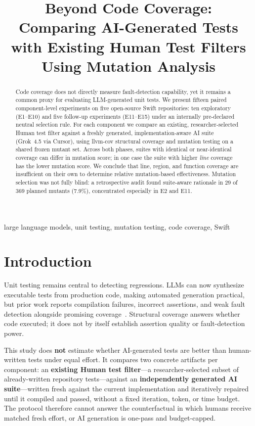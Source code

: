 \documentclass[10pt,conference]{IEEEtran}
\title{Beyond Code Coverage: Comparing AI-Generated Tests with Existing Human Test Filters Using Mutation Analysis}
\author{\IEEEauthorblockN{Premal Mistry, Randhir Kumar}
\IEEEauthorblockA{Independent Researcher}}
\begin{document}
\maketitle

\begin{abstract}
Code coverage does not directly measure fault-detection capability, yet it remains a common proxy for evaluating LLM-generated unit tests. We present fifteen paired component-level experiments on five open-source Swift repositories: ten exploratory (E1--E10) and five follow-up experiments (E11--E15) under an internally pre-declared neutral selection rule. For each component we compare an existing, researcher-selected Human test filter against a freshly generated, implementation-aware AI suite (Grok~4.5 via Cursor), using llvm-cov structural coverage and mutation testing on a shared frozen mutant set. Across both phases, suites with identical or near-identical coverage can differ in mutation score; in one case the suite with higher \emph{line} coverage has the lower mutation score. We conclude that line, region, and function coverage are insufficient on their own to determine relative mutation-based effectiveness. Mutation selection was not fully blind: a retrospective audit found suite-aware rationale in 29 of 369 planned mutants (7.9\%), concentrated especially in E2 and E11.
\end{abstract}

\begin{IEEEkeywords}
large language models, unit testing, mutation testing, code coverage, Swift
\end{IEEEkeywords}

\section{Introduction}
Unit testing remains central to detecting regressions. LLMs can now synthesize executable tests from production code, making automated generation practical, but prior work reports compilation failures, incorrect assertions, and weak fault detection alongside promising coverage~\cite{yuan2023}. Structural coverage answers whether code executed; it does not by itself establish assertion quality or fault-detection power.

This study does \textbf{not} estimate whether AI-generated tests are better than human-written tests under equal effort. It compares two concrete artifacts per component: an \textbf{existing Human test filter}---a researcher-selected subset of already-written repository tests---against an \textbf{independently generated AI suite}---written fresh against the current implementation and iteratively repaired until it compiled and passed, without a fixed iteration, token, or time budget. The protocol therefore cannot answer the counterfactual in which humans receive matched fresh effort, or AI generation is one-pass and budget-capped.
\end{document}
